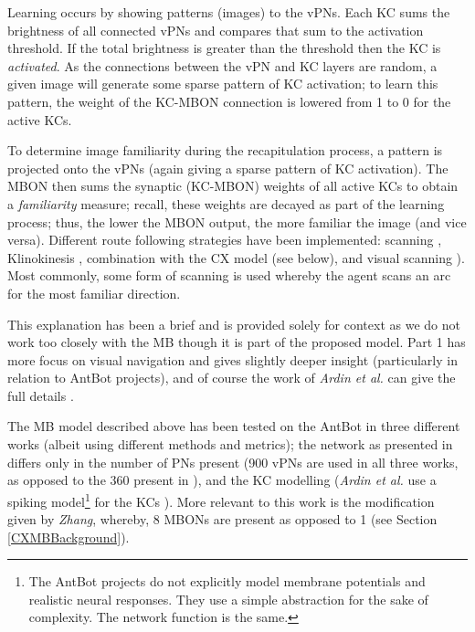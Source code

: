 \documentclass[a4paper,11pt,twoside,openright]{article}
\begin{document}
Learning occurs by showing patterns (images) to the vPNs. Each KC sums the
brightness of all connected vPNs and compares that sum to the activation
threshold. If the total brightness is greater than the threshold then the KC is
\textit{activated}. As the connections between the vPN and KC layers are random,
a given image will generate some sparse pattern of KC activation; to learn this
pattern, the weight of the KC-MBON connection is lowered from 1 to 0 for the
active KCs.
\newline
\par

To determine image familiarity during the recapitulation process, a pattern is
projected onto the vPNs (again giving a sparse pattern of KC activation).
The MBON then sums the synaptic (KC-MBON) weights of all active KCs to obtain a
\textit{familiarity} measure; recall, these weights are decayed as part of the
learning process; thus, the lower the MBON output, the more familiar the image
(and vice versa). Different route following strategies have been implemented:
scanning \cite{Ardin2016, Eberding2016, Zhang2017}, Klinokinesis
\cite{Zhang2017}, combination with the CX model \cite{Zhang2017}(see below), and
visual scanning \cite{Mitchell2018}). Most commonly, some form of scanning
is used whereby the agent scans an arc for the most familiar direction.
\newline
\par

This explanation has been a brief and is provided solely for context
as we do not work too closely with the MB though it is part of the
proposed model. Part 1 has more focus on visual navigation and gives
slightly deeper insight \cite{Mitchell2018} (particularly in relation
to AntBot projects), and of course the work of \textit{Ardin et al.}
can give the full details \cite{Ardin2016}.
\newline
\par

The MB model described above has been tested on the AntBot in three
different works (albeit using different methods and metrics); the
network as presented in \cite{Eberding2016, Zhang2017, Mitchell2018}
differs only in the number of PNs present (900 vPNs are used in all
three works, as opposed to the 360 present in \cite{Ardin2016}), and
the KC modelling (\textit{Ardin et al.} use a spiking
model\footnote{The AntBot projects do not explicitly model membrane
  potentials and realistic neural responses.  They use a simple
  abstraction for the sake of complexity. The network function is the
  same.} for the KCs \cite{Ardin2016}). More relevant to this work is
the modification given by \textit{Zhang}, whereby, 8 MBONs
are present as opposed to 1 (see Section \ref{CXMBBackground}).
\newline
\par
\end{document}
